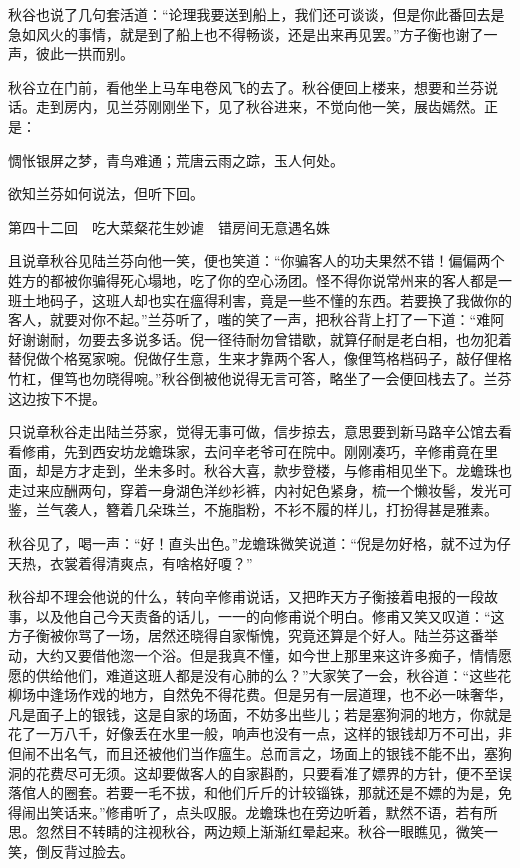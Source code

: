 \documentclass[12pt,UTF8]{ctexbook}
\begin{document}
{{{秋谷也说了几句套活道：“论理我要送到船上，我们还可谈谈，但是你此番回去是急如风火的事情，就是到了船上也不得畅谈，还是出来再见罢。”方子衡也谢了一声，彼此一拱而别。

秋谷立在门前，看他坐上马车电卷风飞的去了。秋谷便回上楼来，想要和兰芬说话。走到房内，见兰芬刚刚坐下，见了秋谷进来，不觉向他一笑，展齿嫣然。正是：

惆怅银屏之梦，青鸟难通；荒唐云雨之踪，玉人何处。

欲知兰芬如何说法，但听下回。





第四十二回　吃大菜粲花生妙谑　错房间无意遇名姝





且说章秋谷见陆兰芬向他一笑，便也笑道：“你骗客人的功夫果然不错！偏偏两个姓方的都被你骗得死心塌地，吃了你的空心汤团。怪不得你说常州来的客人都是一班土地码子，这班人却也实在瘟得利害，竟是一些不懂的东西。若要换了我做你的客人，就要对你不起。”兰芬听了，嗤的笑了一声，把秋谷背上打了一下道：“难阿好谢谢耐，勿要去多说多话。倪一径待耐勿曾错歇，就算仔耐是老白相，也勿犯着替倪做个格冤家啘。倪做仔生意，生来才靠两个客人，像俚笃格档码子，敲仔俚格竹杠，俚笃也勿晓得啘。”秋谷倒被他说得无言可答，略坐了一会便回栈去了。兰芬这边按下不提。

只说章秋谷走出陆兰芬家，觉得无事可做，信步掠去，意思要到新马路辛公馆去看看修甫，先到西安坊龙蟾珠家，去问辛老爷可在院中。刚刚凑巧，辛修甫竟在里面，却是方才走到，坐未多时。秋谷大喜，款步登楼，与修甫相见坐下。龙蟾珠也走过来应酬两句，穿着一身湖色洋纱衫裤，内衬妃色紧身，梳一个懒妆髻，发光可鉴，兰气袭人，簪着几朵珠兰，不施脂粉，不衫不履的样儿，打扮得甚是雅素。

秋谷见了，喝一声：“好！直头出色。”龙蟾珠微笑说道：“倪是勿好格，就不过为仔天热，衣裳着得清爽点，有啥格好嗄？”

秋谷却不理会他说的什么，转向辛修甫说话，又把昨天方子衡接着电报的一段故事，以及他自己今天责备的话儿，一一的向修甫说个明白。修甫又笑又叹道：“这方子衡被你骂了一场，居然还晓得自家惭愧，究竟还算是个好人。陆兰芬这番举动，大约又要借他淴一个浴。但是我真不懂，如今世上那里来这许多痴子，情情愿愿的供给他们，难道这班人都是没有心肺的么？”大家笑了一会，秋谷道：“这些花柳场中逢场作戏的地方，自然免不得花费。但是另有一层道理，也不必一味奢华，凡是面子上的银钱，这是自家的场面，不妨多出些儿；若是塞狗洞的地方，你就是花了一万八千，好像丢在水里一般，响声也没有一点，这样的银钱却万不可出，非但闹不出名气，而且还被他们当作瘟生。总而言之，场面上的银钱不能不出，塞狗洞的花费尽可无须。这却要做客人的自家斟酌，只要看准了嫖界的方针，便不至误落倌人的圈套。若要一毛不拔，和他们斤斤的计较锱铢，那就还是不嫖的为是，免得闹出笑话来。”修甫听了，点头叹服。龙蟾珠也在旁边听着，默然不语，若有所思。忽然目不转睛的注视秋谷，两边颊上渐渐红晕起来。秋谷一眼瞧见，微笑一笑，倒反背过脸去。

}}}
\end{document}
